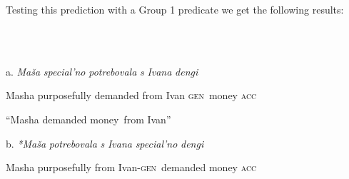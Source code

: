 \documentclass[output=paper,modfonts, nonflat]{langsci/langscibook}
\begin{document}
\begin{styleinnerExample}
Testing this prediction with a Group 1 predicate we get the following results:

\begin{styleinnerExample}
\ea%
    \label{ex:key:48}
    \gll\\
        \\
    \glt
    \z

           a.  \textit{Maša}   \textit{special’no}    \textit{potrebovala} \textit{s}       \textit{Ivana}      \textit{dengi~}
\end{styleinnerExample}

\begin{styleinnerExample}
    Masha purposefully demanded     from Ivan \textsc{gen~}money \textsc{acc}
\end{styleinnerExample}

\begin{styleinnerExample}
    “Masha demanded money~from Ivan”\\\end{styleinnerExample}

\begin{styleinnerExample}
  b.  \textit{*Maša}   \textit{potrebovala}  \textit{s}       \textit{Ivana}       \textit{special’no} \textit{dengi}~
\end{styleinnerExample}

\begin{styleinnerExample}
      Masha purposefully from Ivan\textsc{{}-gen~}demanded  money \textsc{acc}
\end{styleinnerExample}


\end{styleinnerExample}
\end{document}
